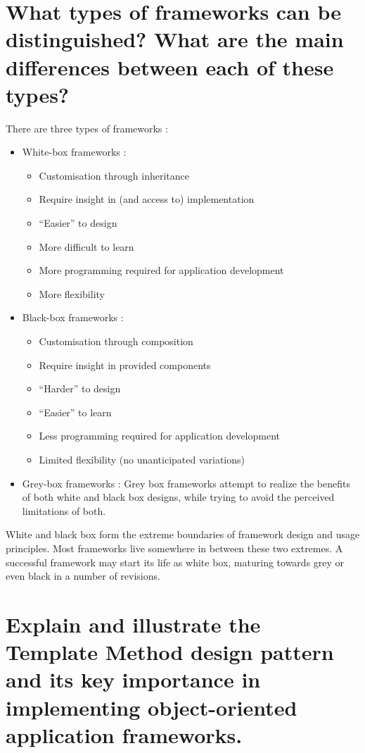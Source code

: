 \section{What types of frameworks can be distinguished?
What are the main differences between each of these types?}
There are three types of frameworks :
\begin{itemize}
\item White-box frameworks :
\begin{itemize}
\item Customisation through inheritance
\item Require insight in (and access to) implementation
\item \enquote{Easier} to design
\item More difficult to learn
\item More programming required for application development 
\item More flexibility
\end{itemize}
\item Black-box frameworks :
\begin{itemize}
\item Customisation through composition
\item Require insight in provided components
\item \enquote{Harder} to design
\item \enquote{Easier} to learn
\item Less programming required for application development 
\item Limited flexibility (no unanticipated variations)
\end{itemize}
\item Grey-box frameworks :  Grey box frameworks attempt to realize the benefits of both white and black box designs, while trying to avoid the perceived limitations of both.
\end{itemize}

White and black box form the extreme boundaries of framework design and usage principles. Most frameworks live somewhere in between these two extremes. A successful framework may start its life as white box, maturing towards grey or even black in a number of revisions.

\section{Explain and illustrate the Template Method design pattern and its key importance in
implementing object-oriented application frameworks.}

